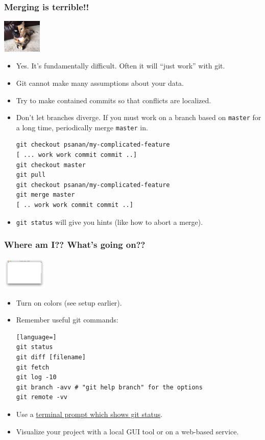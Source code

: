 \documentclass{beamer}
\begin{document}
\begin{frame}[fragile]
\frametitle{Merging is terrible!!}
\begin{center}
\includegraphics[width=70px]{chimera.jpg}
\end{center}
\begin{itemize}
\item Yes. It's fundamentally difficult. Often it will ``just work'' with git.
\item Git cannot make many assumptions about your data.
\item Try to make contained commits so that conflicts are localized.
\item Don't let branches diverge. If you must work on a branch based on \texttt{master} for a long time, periodically merge \texttt{master} in.
\begin{lstlisting}[basicstyle=\tiny\ttfamily]
git checkout psanan/my-complicated-feature
[ ... work work commit commit ..]
git checkout master
git pull
git checkout psanan/my-complicated-feature
git merge master
[ .. work work commit commit ..]
\end{lstlisting}
\item \lstinline{git status} will give you hints (like how to abort a merge).
\end{itemize}
\end{frame}

\begin{frame}[fragile]
\frametitle{Where am I?? What's going on??}
\begin{center}
\includegraphics[width=80px]{term}
\end{center}
\begin{itemize}
\item Turn on colors (see setup earlier).
\item Remember useful git commands:
\begin{lstlisting}[language=]
git status
git diff [filename]
git fetch
git log -10
git branch -avv # "git help branch" for the options
git remote -vv
\end{lstlisting}
\item Use a \href{https://raw.githubusercontent.com/git/git/master/contrib/completion/git-prompt.sh}{terminal prompt which shows git status}.
\item Visualize your project with a local GUI tool or on a web-based service.
\end{itemize}
\end{frame}
\end{document}
